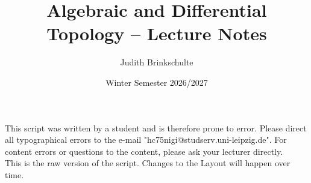 \documentclass[12pt, a4paper]{article}
\title{Algebraic and Differential Topology -- Lecture Notes}
\author{Judith Brinkschulte}
\date{Winter Semester 2026/2027}
\begin{document}
\maketitle

\tableofcontents
{}

\newpage

This script was written by a student and is therefore prone to error. Please direct all typographical errors to the e-mail "hc75nigi@studserv.uni-leipzig.de". For content errors or questions to the content, please ask your lecturer directly. \\
This is the raw version of the script. Changes to the Layout will happen over time.\\










\printindex
\end{document}

